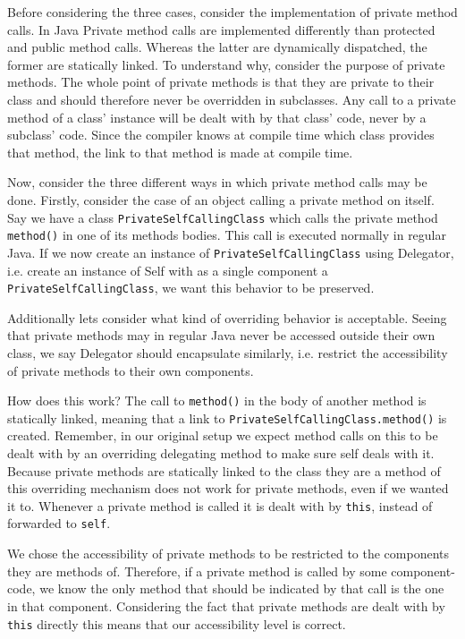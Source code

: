\documentclass[a4paper,12pt]{book}
\begin{document}
Before considering the three cases, consider the implementation of private method calls. In Java Private method calls are implemented differently than protected and public method calls. Whereas the latter are dynamically dispatched, the former are statically linked. To understand why, consider the purpose of private methods. The whole point of private methods is that they are private to their class and should therefore never be overridden in subclasses. Any call to a private method of a class' instance will be dealt with by that class' code, never by a subclass' code. Since the compiler knows at compile time which class provides that method, the link to that method is made at compile time.

Now, consider the three different ways in which private method calls may be done. Firstly, consider the case of an object calling a private method on itself. Say we have a class \verb|PrivateSelfCallingClass| which calls the private method \verb|method()| in one of its methods bodies. This call is executed normally in regular Java. If we now create an instance of \verb|PrivateSelfCallingClass| using Delegator, i.e. create an instance of Self with as a single component a \verb|PrivateSelfCallingClass|, we want this behavior to be preserved.

Additionally lets consider what kind of overriding behavior is acceptable. Seeing that private methods may in regular Java never be accessed outside their own class, we say Delegator should encapsulate similarly, i.e. restrict the accessibility of private methods to their own components.

How does this work? The call to \verb|method()| in the body of another method is statically linked, meaning that a link to \verb|PrivateSelfCallingClass.method()| is created. Remember, in our original setup we expect method calls on this to be dealt with by an overriding delegating method to make sure self deals with it. Because private methods are statically linked to the class they are a method of this overriding mechanism does not work for private methods, even if we wanted it to. Whenever a private method is called it is dealt with by \verb|this|, instead of forwarded to \verb|self|.

We chose the accessibility of private methods to be restricted to the components they are methods of. Therefore, if a private method is called by some component-code, we know the only method that should be indicated by that call is the one in that component. Considering the fact that private methods are dealt with by \verb|this| directly this means that our accessibility level is correct.
\end{document}
